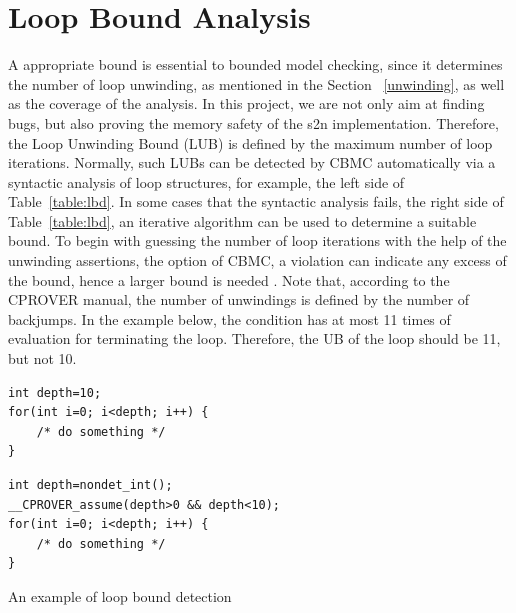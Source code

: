 \section{Loop Bound Analysis}
\label{sec:lba}
A appropriate bound is essential to bounded model checking, since it determines the number of loop unwinding, as mentioned in the Section ~\ref{unwinding}, as well as the coverage of the analysis. In this project, we are not only aim at finding bugs, but also proving the memory safety of the s2n implementation. Therefore, the Loop Unwinding Bound (LUB) is defined by the maximum number of loop iterations. Normally, such LUBs can be detected by CBMC automatically via a syntactic analysis of loop structures, for example, the left side of Table~\ref{table:lbd}. In some cases that the syntactic analysis fails, the right side of Table~\ref{table:lbd}, an iterative algorithm can be used to determine a suitable bound. To begin with guessing the number of loop iterations with the help of the unwinding assertions, the  option of CBMC, a violation can indicate any excess of the bound, hence a larger bound is needed \cite{4544862, ckl2004}. Note that, according to the CPROVER manual, the number of unwindings is defined by the number of backjumps. In the example below, the condition  has at most 11 times of evaluation for terminating the loop. Therefore, the UB of the loop should be 11, but not 10. 

\begin{table}[t]
\centering
\begin{minipage}[t]{.4\textwidth}
\centering
\begin{verbatim}
int depth=10;
for(int i=0; i<depth; i++) { 
    /* do something */ 
}
\end{verbatim}
\end{minipage}\hfill
\begin{minipage}[t]{.5\textwidth}
\centering
\begin{verbatim}
int depth=nondet_int();
__CPROVER_assume(depth>0 && depth<10);
for(int i=0; i<depth; i++) { 
    /* do something */ 
}
\end{verbatim}
\end{minipage}
\hfill
{}
\caption{An example of loop bound detection}
\label{table:lbd}
\end{table}

